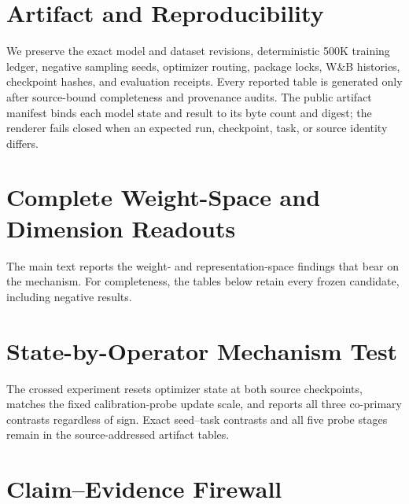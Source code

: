 \documentclass[11pt]{article}
\begin{document}


\appendix

\section{Artifact and Reproducibility}

We preserve the exact model and dataset revisions, deterministic 500K training ledger, negative
sampling seeds, optimizer routing, package locks, W\&B histories, checkpoint hashes, and evaluation
receipts. Every reported table is generated only after source-bound completeness and provenance
audits. The public artifact manifest binds each model state and result to its byte count and digest;
the renderer fails closed when an expected run, checkpoint, task, or source identity differs.

\section{Complete Weight-Space and Dimension Readouts}

The main text reports the weight- and representation-space findings that bear on the mechanism.
For completeness, the tables below retain every frozen candidate, including negative results.

\CorrectedGeometryBridgeTable

\DimensionUtilizationAppendixTable

\section{State-by-Operator Mechanism Test}

The crossed experiment resets optimizer state at both source checkpoints, matches the fixed
calibration-probe update scale, and reports all three co-primary contrasts regardless of sign.
Exact seed--task contrasts and all five probe stages remain in the source-addressed artifact tables.

\StateOperatorAppendixTable

\FloatBarrier

\section{Claim--Evidence Firewall}
\end{document}
